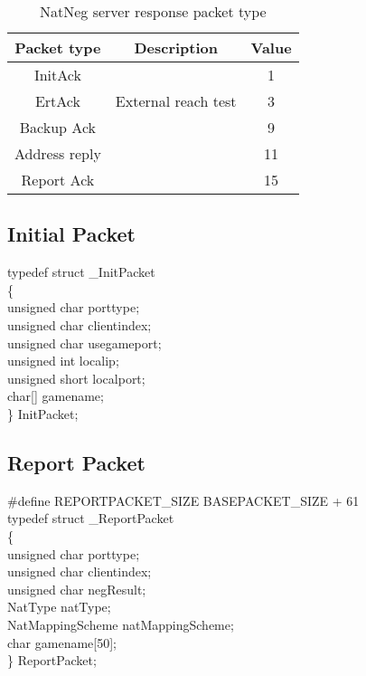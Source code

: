 \documentclass[oneside,titlepage,a4paper]{Definition/retrospy} %
\begin{document}
\begin{table}[H]
	\centering
	\begin{tabular}{|c|c|c|}
		\hline
		\textbf{Packet type} &\textbf{Description}&\textbf{Value}\\\hline
		InitAck&&1\\\hline
		ErtAck&External reach test&3\\\hline
		Backup Ack&&9\\\hline
		Address reply&&11\\\hline
		Report Ack&&15\\\hline
	\end{tabular}
	\caption{NatNeg server response packet type}
	\label{NatNeg server response packet type}
\end{table}


%
%
%
%


\subsection{Initial Packet}
\begin{mybox}
	typedef struct \_InitPacket\\
	\{\\
	unsigned char porttype;\\
	unsigned char clientindex;\\
	unsigned char usegameport;\\
	unsigned int localip;\\
	unsigned short localport;\\
		char[] gamename;\\
	\} InitPacket;\\

\end{mybox}

\subsection{Report Packet}

\begin{mybox}
	\#define REPORTPACKET\_SIZE BASEPACKET\_SIZE + 61\\
	typedef struct \_ReportPacket\\
	\{\\
	unsigned char porttype;\\
	unsigned char clientindex;\\
	unsigned char negResult;\\
	NatType natType;\\
	NatMappingScheme natMappingScheme;\\
	char gamename[50];\\
	\} ReportPacket;\\
\end{mybox}
\end{document}
